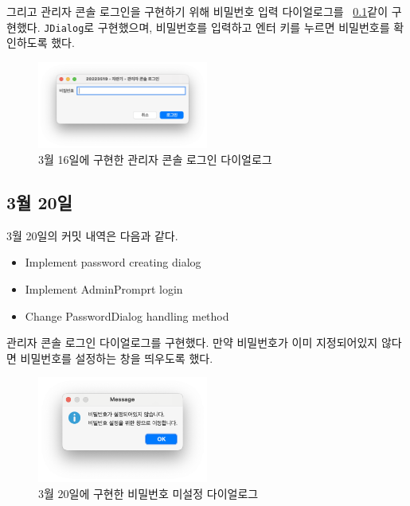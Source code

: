 \documentclass{oblivoir}
\newcommand{\figref}[1]{\figurename~\ref{#1}}
\begin{document}
    그리고 관리자 콘솔 로그인을 구현하기 위해 비밀번호 입력 다이얼로그를 \figref{}\와 같이 구현했다.
    \texttt{JDialog}로 구현했으며, 비밀번호를 입력하고 엔터 키를 누르면 비밀번호를 확인하도록 했다.
    \begin{figure}[h]
        \centering
        \includegraphics[width=0.5\textwidth]{0316-password-dialog.png}
        \caption{3월 16일에 구현한 관리자 콘솔 로그인 다이얼로그}
        \label{fig:0316-password-dialog}
    \end{figure}

    \subsection{3월 20일}

    3월 20일의 커밋 내역은 다음과 같다.
    \begin{itemize}
        \item Implement password creating dialog
        \item Implement AdminPromprt login
        \item Change PasswordDialog handling method
    \end{itemize}

    관리자 콘솔 로그인 다이얼로그를 구현했다.
    만약 비밀번호가 이미 지정되어있지 않다면 비밀번호를 설정하는 창을 띄우도록 했다.
    \begin{figure}[h]
        \centering
        \includegraphics[width=0.5\textwidth]{0320-password-not-set.png}
        \caption{3월 20일에 구현한 비밀번호 미설정 다이얼로그}
        \label{fig:0320-password-not-set}
    \end{figure}
\end{document}
